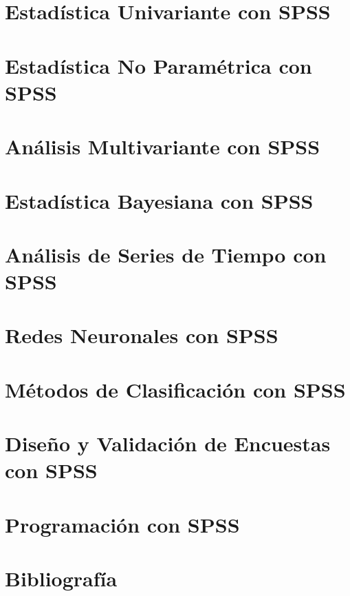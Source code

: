 \documentclass[
  letterpaper,
  DIV=11,
  numbers=noendperiod]{scrreprt}
\begin{document}
\chapter{Estadística Univariante con
SPSS}\label{estaduxedstica-univariante-con-spss}


\chapter{Estadística No Paramétrica con
SPSS}\label{estaduxedstica-no-paramuxe9trica-con-spss}


\chapter{Análisis Multivariante con
SPSS}\label{anuxe1lisis-multivariante-con-spss}


\chapter{Estadística Bayesiana con
SPSS}\label{estaduxedstica-bayesiana-con-spss}


\chapter{Análisis de Series de Tiempo con
SPSS}\label{anuxe1lisis-de-series-de-tiempo-con-spss}


\chapter{Redes Neuronales con SPSS}\label{redes-neuronales-con-spss}


\chapter{Métodos de Clasificación con
SPSS}\label{muxe9todos-de-clasificaciuxf3n-con-spss}


\chapter{Diseño y Validación de Encuestas con
SPSS}\label{diseuxf1o-y-validaciuxf3n-de-encuestas-con-spss}


\chapter{Programación con SPSS}\label{programaciuxf3n-con-spss}


\chapter{Bibliografía}\label{bibliografuxeda}
\end{document}
